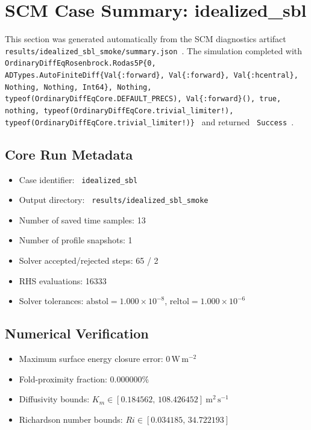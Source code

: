 \section{SCM Case Summary: idealized\_sbl}
\label{sec:scm_case_idealized_sbl_smoke_scm_case_report}

This section was generated automatically from the SCM diagnostics artifact
\texttt{ results/idealized\_sbl\_smoke/summary.json }. The simulation completed with \texttt{ OrdinaryDiffEqRosenbrock.Rodas5P\{0, ADTypes.AutoFiniteDiff\{Val\{:forward\}, Val\{:forward\}, Val\{:hcentral\}, Nothing, Nothing, Int64\}, Nothing, typeof(OrdinaryDiffEqCore.DEFAULT\_PRECS), Val\{:forward\}(), true, nothing, typeof(OrdinaryDiffEqCore.trivial\_limiter!), typeof(OrdinaryDiffEqCore.trivial\_limiter!)\} }
and returned \texttt{ Success }.

\subsection{Core Run Metadata}
\begin{itemize}
  \item Case identifier: \texttt{ idealized\_sbl }
  \item Output directory: \texttt{ results/idealized\_sbl\_smoke }
  \item Number of saved time samples: 13
  \item Number of profile snapshots: 1
  \item Solver accepted/rejected steps: 65 / 2
  \item RHS evaluations: 16333
  \item Solver tolerances: $\mathrm{abstol}=1.000 \times 10^{-8}$, $\mathrm{reltol}=1.000 \times 10^{-6}$
\end{itemize}

\subsection{Numerical Verification}
\begin{itemize}
  \item Maximum surface energy closure error:
  $0\,\mathrm{W\,m^{-2}}$
  \item Fold-proximity fraction:
  $0.000000\%$
  \item Diffusivity bounds:
  $K_m \in [0.184562,\,108.426452]~\mathrm{m^2\,s^{-1}}$
  \item Richardson number bounds:
  $Ri \in [0.034185,\,34.722193]$
\end{itemize}

